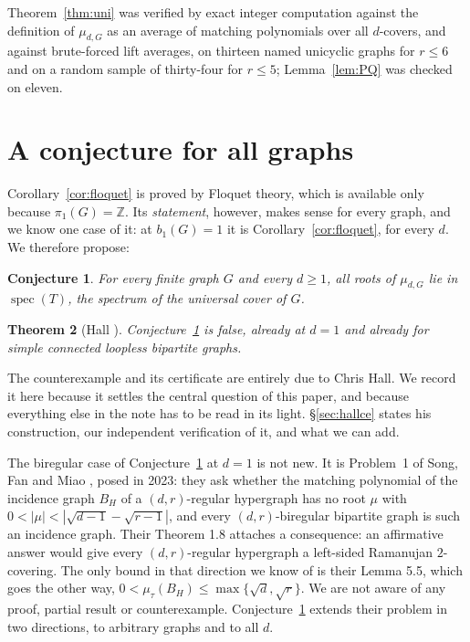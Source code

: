 \documentclass[11pt]{article}
\newtheorem{theorem}{Theorem}
\newtheorem{conjecture}[theorem]{Conjecture}
\theoremstyle{remark}
\begin{document}
Theorem~\ref{thm:uni} was verified by exact integer computation against the
definition of $\mu_{d,G}$ as an average of matching polynomials over all
$d$-covers, and against brute-forced lift averages, on thirteen named unicyclic
graphs for $r\le6$ and on a random sample of thirty-four for $r\le5$;
Lemma~\ref{lem:PQ} was checked on eleven.

\section{A conjecture for all graphs}\label{sec:conj}
Corollary~\ref{cor:floquet} is proved by Floquet theory, which is available
only because $\pi_1(G)=\mathbb{Z}$. Its \emph{statement}, however, makes sense
for every graph, and we know one case of it: at $b_1(G)=1$ it is
Corollary~\ref{cor:floquet}, for every $d$. We therefore propose:

\begin{conjecture}\label{conj:gap}
For every finite graph $G$ and every $d\ge1$, all roots of $\mu_{d,G}$ lie in
$\operatorname{spec}(T)$, the spectrum of the universal cover of $G$.
\end{conjecture}

\begin{theorem}[Hall \cite{HallCE}]\label{thm:hallce}
Conjecture~\ref{conj:gap} is false, already at $d=1$ and already for simple connected
loopless bipartite graphs.
\end{theorem}

The counterexample and its certificate are entirely due to Chris Hall. We record it here
because it settles the central question of this paper, and because everything else in the
note has to be read in its light. \S\ref{sec:hallce} states his construction, our
independent verification of it, and what we can add.

The biregular case of Conjecture~\ref{conj:gap} at $d=1$ is not new. It is
Problem~1 of Song, Fan and Miao \cite{SFM}, posed in 2023: they ask whether the
matching polynomial of the incidence graph $B_H$ of a $(d,r)$-regular hypergraph
has no root $\mu$ with $0<|\mu|<|\sqrt{d-1}-\sqrt{r-1}|$, and every
$(d,r)$-biregular bipartite graph is such an incidence graph. Their Theorem 1.8
attaches a consequence: an affirmative answer would give every $(d,r)$-regular
hypergraph a left-sided Ramanujan $2$-covering. The only bound in that direction
we know of is their Lemma 5.5, which goes the other way,
$0<\mu_{\tau}(B_H)\le\max\{\sqrt d,\sqrt r\}$. We are not aware of any proof,
partial result or counterexample. Conjecture~\ref{conj:gap} extends their problem
in two directions, to arbitrary graphs and to all $d$.
\end{document}
